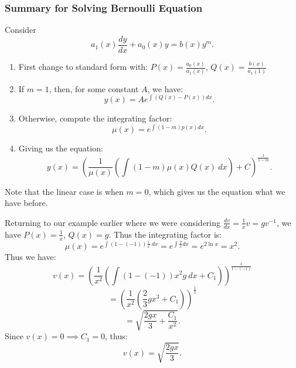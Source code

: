 \documentclass[../main/main.tex]{subfiles}
\begin{document}
\subsubsection{Summary for Solving Bernoulli Equation}
Consider \[
	a_1(x) \frac{dy}{dx}+a_0(x)y=b(x) y^{m}
.\] 
\begin{enumerate}
	\item First change to standard form with: $P(x) = \frac{a_0(x)}{a_1(x)}$, $Q(x) =\frac{b(x)}{a_1(1)}$
	\item If $m=1$, then, for some constant $A$, we have: \[
			y(x) = Ae^{\int (Q(x)-P(x))dx}
	.\] 
\item Otherwise, compute the integrating factor: \[
		\mu(x) = e^{\int(1-m)p(x)dx}
.\] 
\item Giving us the equation: \[
		y(x) = \left( \frac{1}{\mu(x)}\left( \int (1-m) \mu(x) Q(x)~dx \right) +C \right) ^{\frac{1}{1-m}}
.\] 
\end{enumerate}
\begin{remark}
	Note that the linear case is when $m=0$, which gives us the equation what we have before.
\end{remark}
\begin{example}
	Returning to our example earlier where we were considering $\frac{dv}{dx}=\frac{1}{x}v=gv^{-1}$, we have $P(x) = \frac{1}{x}$, $Q(x) = g$. Thus the integrating factor is:  \[
		\mu(x) = e^{\int (1-(-1))\frac{1}{x}~dx} = e^{\int \frac{2}{x}dx} = e^{2\ln x} = x^2
	.\] 
	Thus we have: \[
		v(x) = \left( \frac{1}{x^2}\left( \int(1-(-1))x^2 g~dx + C_1 \right)  \right) ^{\frac{1}{1-(-1)}}
	\] \[
	= \left( \frac{1}{x^2}\left( \frac{2}{3}gx^3+C_1 \right)  \right) ^{\frac{1}{2}}
	\] \[
	 = \sqrt{\frac{2gx}{3}+\frac{C_1}{x^2}} 
 .\]  Since $v(x) = 0 \implies C_1 = 0$, thus: \[
 v(x) = \sqrt{\frac{2gx}{3}} 
 .\] 
\end{example}
\end{document}
